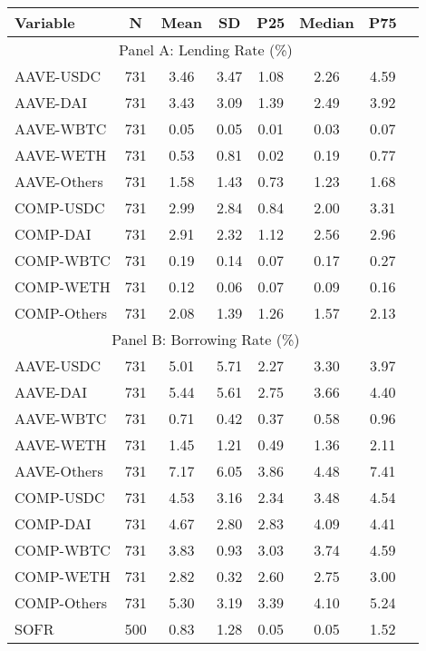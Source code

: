 \begin{table}[ht!]
\begin{tabular*}{\linewidth}{@{\extracolsep{\fill}}lccccccc}
    \toprule
    Variable  & N & Mean & SD & P25 & Median & P75 \\
    \midrule
    \multicolumn{7}{c}{Panel A: Lending Rate (\%)} \\
    \midrule
    AAVE-USDC  & 731   & 3.46  & 3.47  & 1.08  & 2.26  & 4.59 \\[2pt]
    AAVE-DAI  & 731   & 3.43  & 3.09  & 1.39  & 2.49  & 3.92 \\[2pt]
    AAVE-WBTC  & 731   & 0.05  & 0.05  & 0.01  & 0.03  & 0.07 \\[2pt]
    AAVE-WETH  & 731   & 0.53  & 0.81  & 0.02  & 0.19  & 0.77 \\[2pt]
    AAVE-Others  & 731   & 1.58  & 1.43  & 0.73  & 1.23  & 1.68 \\[2pt]
    COMP-USDC  & 731   & 2.99  & 2.84  & 0.84  & 2.00  & 3.31 \\[2pt]
    COMP-DAI  & 731   & 2.91  & 2.32  & 1.12  & 2.56  & 2.96 \\[2pt]
    COMP-WBTC  & 731   & 0.19  & 0.14  & 0.07  & 0.17  & 0.27 \\[2pt]
    COMP-WETH  & 731   & 0.12  & 0.06  & 0.07  & 0.09  & 0.16 \\[2pt]
    COMP-Others  & 731   & 2.08  & 1.39  & 1.26  & 1.57  & 2.13 \\
    \midrule
    \multicolumn{7}{c}{Panel B: Borrowing Rate (\%)} \\
    \midrule
    AAVE-USDC  & 731   & 5.01  & 5.71  & 2.27  & 3.30  & 3.97 \\[2pt]
    AAVE-DAI  & 731   & 5.44  & 5.61  & 2.75  & 3.66  & 4.40 \\[2pt]
    AAVE-WBTC  & 731   & 0.71  & 0.42  & 0.37  & 0.58  & 0.96 \\[2pt]
    AAVE-WETH  & 731   & 1.45  & 1.21  & 0.49  & 1.36  & 2.11 \\[2pt]
    AAVE-Others  & 731   & 7.17  & 6.05  & 3.86  & 4.48  & 7.41 \\[2pt]
    COMP-USDC  & 731   & 4.53  & 3.16  & 2.34  & 3.48  & 4.54 \\[2pt]
    COMP-DAI  & 731   & 4.67  & 2.80  & 2.83  & 4.09  & 4.41 \\[2pt]
    COMP-WBTC  & 731   & 3.83  & 0.93  & 3.03  & 3.74  & 4.59 \\[2pt]
    COMP-WETH  & 731   & 2.82  & 0.32  & 2.60  & 2.75  & 3.00 \\[2pt]
    COMP-Others  & 731   & 5.30  & 3.19  & 3.39  & 4.10  & 5.24 \\[2pt]
    SOFR  & 500   & 0.83  & 1.28  & 0.05  & 0.05  & 1.52 \\
    \bottomrule

          \end{tabular*} 



\end{table}%
    
